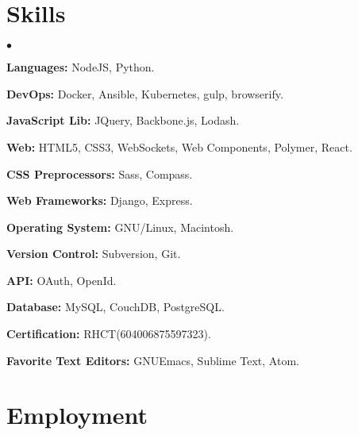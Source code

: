 \documentclass[margin, line, 10pt]{res}
\newenvironment{list2}{
  \begin{list}{$\bullet$}{%
      \setlength{\itemsep}{0in}
      \setlength{\parsep}{0in} \setlength{\parskip}{0in}
      \setlength{\topsep}{0in} \setlength{\partopsep}{0in}
      \setlength{\leftmargin}{0.2in}}}{\end{list}}
\begin{document}
\begin{resume}
\section{Skills}
\begin{list2}
\item {\bf Languages:} NodeJS, Python.\\
\vspace{-.3cm}
\item {\bf DevOps:} Docker, Ansible, Kubernetes, gulp, browserify.\\
\vspace{-.3cm}
\item {\bf JavaScript Lib:} JQuery, Backbone.js, Lodash.\\
\vspace{-.3cm}
\item {\bf Web:} HTML5, CSS3, WebSockets, Web Components, Polymer, React.\\
\vspace{-.3cm}
\item {\bf CSS Preprocessors:} Sass, Compass.\\
\vspace{-.3cm}
\item {\bf Web Frameworks:} Django, Express.\\
\vspace{-.3cm}
\item {\bf Operating System:} GNU/Linux, Macintosh.\\
\vspace{-.3cm}
\item {\bf Version Control:} Subversion, Git.\\
\vspace{-.3cm}
\item {\bf API:} OAuth, OpenId.\\
\vspace{-.3cm}
\item {\bf Database:} MySQL, CouchDB, PostgreSQL.\\
\vspace{-.3cm}
\item {\bf Certification:} RHCT(604006875597323).\\
\vspace{-.3cm}
\item {\bf Favorite Text Editors:} GNUEmacs, Sublime Text, Atom.\\
\vspace{-.3cm}
\end{list2}

\section{Employment}


\end{resume}
\end{document}
